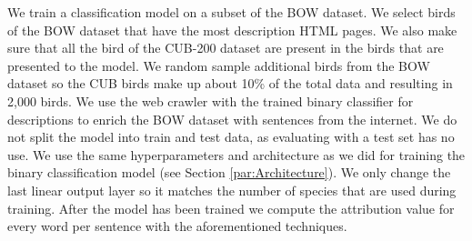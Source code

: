 \documentclass[a4paper, 12pt, oneside]{book} %
\begin{document}
We train a classification model on a subset of the BOW dataset.
We select birds of the BOW dataset that have the most description HTML pages.
We also make sure that all the bird of the CUB-200 dataset are present in the birds that are presented to the model.
We random sample additional birds from the BOW dataset so the CUB birds make up about 10\% of the total data and resulting in 2,000 birds.
We use the web crawler with the trained binary classifier for descriptions to enrich the BOW dataset with sentences from the internet.
We do not split the model into train and test data, as evaluating with a test set has no use.
We use the same hyperparameters and architecture as we did for training the binary classification model (see Section \ref{par:Architecture}).
We only change the last linear output layer so it matches the number of species that are used during training.
After the model has been trained we compute the attribution value for every word per sentence with the aforementioned techniques.

%

\end{document}
